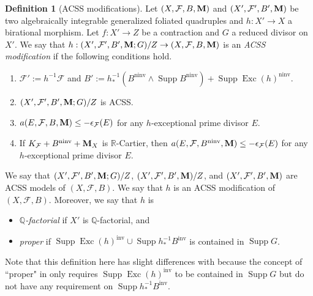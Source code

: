 \documentclass[12pt]{amsart}
\numberwithin{equation}{section}
\newcommand{\Mm}{{\bf{M}}}
\newcommand{\Qq}{\mathbb{Q}}
\newcommand{\Rr}{\mathbb{R}}
\newcommand{\Exc}{\operatorname{Exc}}
\newcommand{\ninv}{\operatorname{ninv}}
\newcommand{\inv}{\operatorname{inv}}
\newcommand{\Supp}{\operatorname{Supp}}
\newcommand{\Ff}{\mathcal{F}}
\theoremstyle{definition}
\newtheorem{defn}[thm]{Definition}
\theoremstyle{definition}
\theoremstyle{definition}
\begin{document}
\begin{defn}[ACSS modifications]\label{defn: simple model}
    Let $(X,\Ff,B,\Mm)$ and $(X',\Ff',B',\Mm)$ be two algebraically integrable generalized foliated quadruples and $h: X'\rightarrow X$ a birational morphism. Let $f: X'\rightarrow Z$ be a contraction and $G$ a reduced divisor on $X'$. We say that $h: (X',\Ff',B',\Mm;G)/Z\rightarrow (X,\Ff,B,\Mm)$ is an \emph{ACSS modification} if the following conditions hold.
    \begin{enumerate}
        \item $\Ff':=h^{-1}\Ff$ and $B':=h^{-1}_\ast (B^{\ninv}\wedge\Supp B^{\ninv})+\Supp\Exc(h)^{\ninv}$.
        \item $(X',\Ff',B',\Mm;G)/Z$ is ACSS.
        \item  $a(E,\Ff,B,\Mm)\leq-\epsilon_{\Ff}(E)$ for any $h$-exceptional prime divisor $E$.
        \item If $K_{\Ff}+B^{\ninv}+\Mm_X$ is $\Rr$-Cartier, then $a(E,\Ff,B^{\ninv},\Mm)\leq-\epsilon_{\Ff}(E)$ for any $h$-exceptional prime divisor $E$.
    \end{enumerate}
 We say that $(X',\Ff',B',\Mm;G)/Z$, $(X',\Ff',B',\Mm)/Z$, and $(X',\Ff',B',\Mm)$ are ACSS models of $(X,\Ff,B)$.     We say that $h$ is an ACSS modification of $(X,\Ff,B)$. Moreover, we say that $h$ is
\begin{itemize}
\item \emph{$\Qq$-factorial} if $X'$ is $\Qq$-factorial, and
\item \emph{proper} if $\Supp\Exc(h)^{\inv}\cup\Supp h^{-1}_\ast B^{\inv}$ is contained in $\Supp G$.
\end{itemize}
Note that this definition here has slight differences with \cite{CHLX23,LMX24b} because the concept of ``proper" in \cite{CHLX23,LMX24b} only requires $\Supp\Exc(h)^{\inv}$ to be contained in $\Supp G$ but do not have any requirement on $\Supp h^{-1}_\ast B^{\inv}$.
\end{defn}
\end{document}
